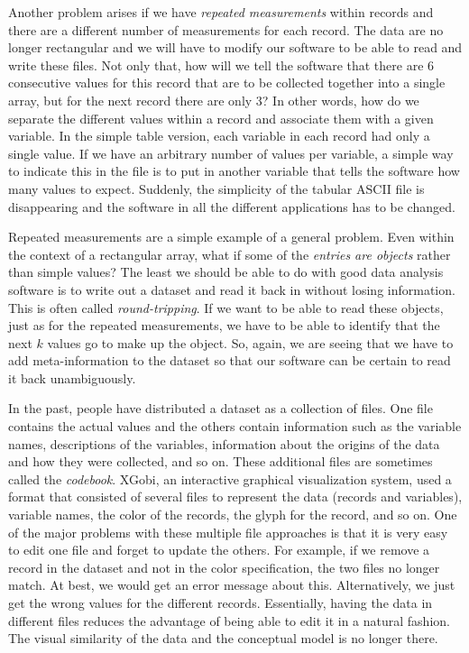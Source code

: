 Another problem arises if we have \textit{repeated measurements} within
records and there are a different number of measurements for each
record.  The data are no longer rectangular and we will have to modify
our software to be able to read and write these files.  Not only that,
how will we tell the software that there are 6 consecutive values for
this record that are to be collected together into a single array, but
for the next record there are only 3? In other words, how do we
separate the different values within a record and associate them with
a given variable.  In the simple table version, each variable in each
record had only a single value. If we have an arbitrary number of
values per variable, a simple way to indicate this in the file is to
put in another variable that tells the software how many values to
expect.  Suddenly, the simplicity of the tabular ASCII file is
disappearing and the software in all the different applications has to
be changed.

Repeated measurements are a simple example of a general problem. Even
within the context of a rectangular array, what if some of the
\textit{entries are objects} rather than simple values?  The least we
should be able to do with good data analysis software is to write out
a dataset and read it back in without losing information. This is
often called \textit{round-tripping}.  If we want to be able to read
these objects, just as for the repeated measurements, we have to be
able to identify that the next $k$ values go to make up the object.
So, again, we are seeing that we have
to add meta-information to the dataset so that our software
can be certain to read it back unambiguously.


In the past, people have distributed a dataset as a collection of
files.  One file contains the actual values and the others contain
information such as the variable names, descriptions of the variables,
information about the origins of the data and how they were collected,
and so on. These additional files are sometimes called the \textit{codebook}.
XGobi, an interactive graphical visualization system, used
a format that consisted of several files to represent the data
(records and variables), variable names, the color of the records, the
glyph for the record, and so on.  One of the major problems with these
multiple file approaches is that it is very easy to edit one file and
forget to update the others. For example, if we remove a record in
the dataset and not in the color specification, the two files no longer
match. At best, we would get an error message about this. Alternatively,
we just get the wrong values for the different records.  Essentially,
having the data in different files reduces the advantage of being able
to edit it in a natural fashion. The visual similarity of the data and
the conceptual model is no longer there.

